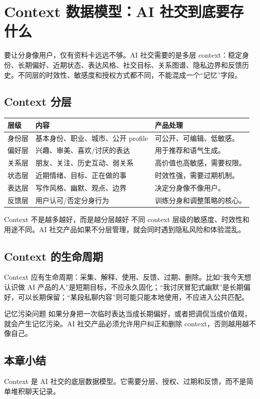 \section{Context 数据模型：AI 社交到底要存什么}

要让分身像用户，仅有资料卡远远不够。AI 社交需要的是多层 context：稳定身份、长期偏好、近期状态、表达风格、社交目标、关系图谱、隐私边界和反馈历史。不同层的时效性、敏感度和授权方式都不同，不能混成一个“记忆”字段。

\subsection{Context 分层}

\noindent\begin{longtable}{p{}p{}p{}}
\toprule
层级 & 内容 & 产品处理 \\
\midrule
身份层 & 基本身份、职业、城市、公开 profile & 可公开、可编辑、低敏感。 \\
偏好层 & 兴趣、审美、喜欢/讨厌的表达 & 用于推荐和语气生成。 \\
关系层 & 朋友、关注、历史互动、弱关系 & 高价值也高敏感，需要权限。 \\
状态层 & 近期情绪、目标、正在做的事 & 时效性强，需要过期机制。 \\
表达层 & 写作风格、幽默、观点、边界 & 决定分身像不像用户。 \\
反馈层 & 用户认可/否定分身行为 & 训练分身和调整策略的核心。 \\
\bottomrule
\end{longtable}

\begin{importantbox}{Context 不是越多越好，而是越分层越好}
不同 context 层级的敏感度、时效性和用途不同。AI 社交产品如果不分层管理，就会同时遇到隐私风险和体验混乱。
\end{importantbox}

\subsection{Context 的生命周期}

Context 应有生命周期：采集、解释、使用、反馈、过期、删除。比如“我今天想认识做 AI 产品的人”是短期目标，不应永久固化；“我讨厌冒犯式幽默”是长期偏好，可以长期保留；“某段私聊内容”则可能只能本地使用，不应进入公共匹配。

\begin{warningbox}{记忆污染问题}
如果分身把一次临时表达当成长期偏好，或者把调侃当成价值观，就会产生记忆污染。AI 社交产品必须允许用户纠正和删除 context，否则越用越不像自己。
\end{warningbox}

\subsection{本章小结}

Context 是 AI 社交的底层数据模型。它需要分层、授权、过期和反馈，而不是简单堆积聊天记录。

